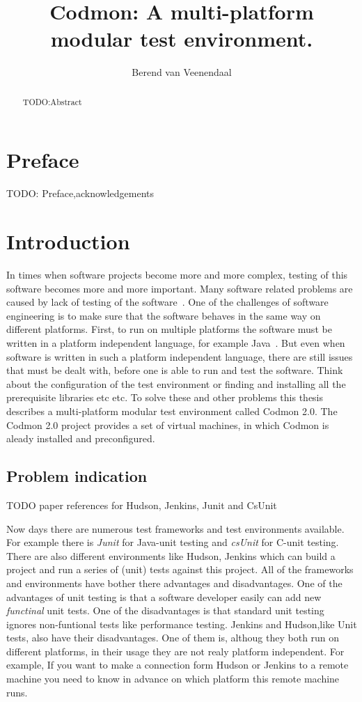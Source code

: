 \documentclass[a4paper,10pt]{scrartcl}
\title{Codmon: A multi-platform modular test environment.}
\author{Berend van Veenendaal}
\newcommand{\project}{Codmon 2.0}
\newcommand{\CS}{C\nolinebreak\hspace{-.05em}\raisebox{.6ex}{\bf \#}}
\begin{document}
\maketitle

\begin{abstract}
TODO:Abstract
\end{abstract}
\newpage
\section*{Preface}
\label{sec:Preface}
TODO: Preface,acknowledgements
\newpage
\tableofcontents
\newpage

\section{Introduction}
\label{sec:Introduction}
In times when software projects become more and more complex, testing of this software becomes more and more important. Many software
related problems are caused by lack of testing of the software~\cite{TTCST}. One of the challenges of software engineering is to make
sure that the software behaves in the same way on different platforms. First, to run on multiple platforms the software must be written in a
platform independent language, for example Java~\cite{Java}. But even when software is written in such a platform independent language, there 
are still issues that must be dealt with, before one is able to run and test the software. Think about the configuration of the test environment 
or finding and installing all the prerequisite libraries etc etc. To solve these and other problems this thesis describes a multi-platform modular
test environment called \project{}. The \project{} project provides a set of virtual machines, in which Codmon is aleady installed and
preconfigured.

\subsection{Problem indication}
\label{subsec:Problemindication}
TODO paper references for Hudson, Jenkins, Junit and CsUnit 


Now days there are numerous test frameworks and test environments available. For example there is \emph{Junit} for Java-unit testing and \emph{csUnit} for \CS{}-unit testing.
There are also different environments like Hudson, Jenkins which can build a project and run a series of (unit) tests against this project. All of the frameworks
and environments have bother there advantages and disadvantages. One of the advantages of unit testing is that a software developer easily can add new \emph{functinal} unit tests.
One of the disadvantages is that standard unit testing ignores non-funtional tests like performance testing. Jenkins and Hudson,like Unit tests, also have their
disadvantages. One of them is, althoug they both run on different platforms, in their usage they are not realy platform independent. For example, If you want
to make a connection form Hudson or Jenkins to a remote machine you need to know in advance on which platform this remote machine runs.
\end{document}
